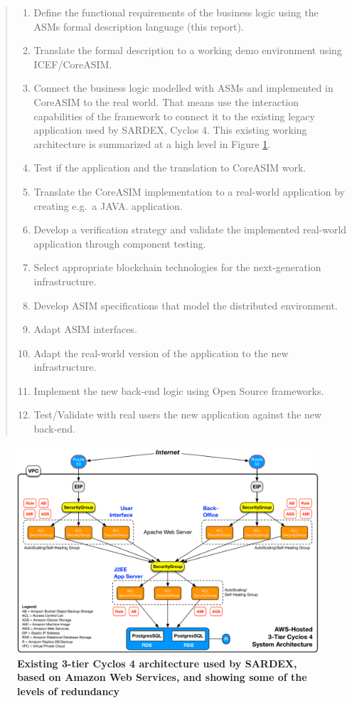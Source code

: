 \begin{quote}
\small
\begin{enumerate}
	\item Define the functional requirements of the business logic using the ASMs formal description language (this report).
	\item Translate the formal description to a working demo environment using ICEF/CoreASIM.
	\item Connect the business logic modelled with ASMs and implemented in CoreASIM to the real world. That means use the interaction capabilities of the framework to connect it to the existing legacy application used by SARDEX, Cyclos 4. This existing working architecture is summarized at a high level in Figure \ref{cyclosarchitecture}.
	\item Test if the application and the translation to CoreASIM work.
	\item Translate the CoreASIM implementation to a real-world application by creating e.g.\ a JAVA. application.
	\item Develop a verification strategy and validate the implemented real-world application through component testing.
	\item Select appropriate blockchain technologies for the next-generation infrastructure.
	\item Develop ASIM specifications that model the distributed environment.
	\item Adapt ASIM interfaces.
	\item Adapt the real-world version of the application to the new infrastructure.
	\item Implement the new back-end logic using Open Source frameworks.
	\item Test/Validate with real users the new application against the new back-end.
\end{enumerate}
\end{quote}



\begin{figure}
\centering
\includegraphics[width=25cm]{Figures/3-Tier_Cyclos_Architecture}
\caption{\small\textbf{Existing 3-tier Cyclos 4 architecture used by SARDEX, based on Amazon Web Services, and showing some of the levels of redundancy}}
\label{cyclosarchitecture}
\end{figure}

